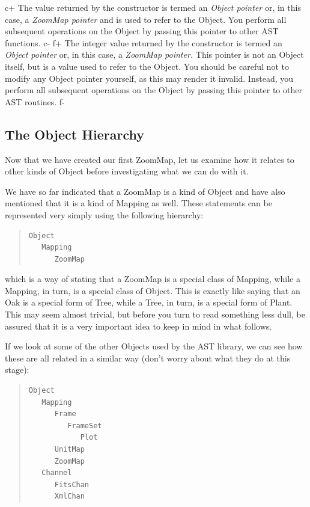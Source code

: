 \documentclass[twoside,11pt]{article}
\begin{document}
c+
The value returned by the constructor is termed an {\em{Object pointer}}
or, in this case, a {\em{ZoomMap pointer}} and is used to refer to the
Object.  You perform all subsequent operations on the Object by
passing this pointer to other AST functions.
c-
f+
The integer value returned by the constructor is termed an {\em{Object
pointer}} or, in this case, a {\em{ZoomMap pointer.}} This pointer is not
an Object itself, but is a value used to refer to the Object. You
should be careful not to modify any Object pointer yourself, as this
may render it invalid. Instead, you perform all subsequent operations
on the Object by passing this pointer to other AST routines.
f-

\subsection{\label{ss:objecthierarchy}The Object Hierarchy}

Now that we have created our first ZoomMap, let us examine how it
relates to other kinds of Object before investigating what we can do
with it.

We have so far indicated that a ZoomMap is a kind of Object and have
also mentioned that it is a kind of Mapping as well. These statements
can be represented very simply using the following hierarchy:

\begin{quote}
\small
\begin{verbatim}
Object
   Mapping
      ZoomMap
\end{verbatim}
\normalsize
\end{quote}

which is a way of stating that a ZoomMap is a special class of
Mapping, while a Mapping, in turn, is a special class of Object.  This
is exactly like saying that an Oak is a special form of Tree, while a
Tree, in turn, is a special form of Plant. This may seem almost
trivial, but before you turn to read something less dull, be assured
that it is a very important idea to keep in mind in what follows.

If we look at some of the other Objects used by the AST library, we
can see how these are all related in a similar way (don't worry about
what they do at this stage):
\label{ss:mappinghierarchy}

\begin{quote}
\small
\begin{verbatim}
Object
   Mapping
      Frame
         FrameSet
            Plot
      UnitMap
      ZoomMap
   Channel
      FitsChan
      XmlChan
\end{verbatim}
\normalsize
\end{quote}
\end{document}

